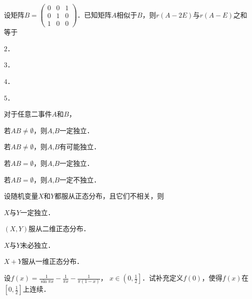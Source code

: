 \documentclass[plain,noanswer,medmath]{../../template/jnuexam}
\begin{document}


\begin{problem}
设矩阵$B = \begin{pmatrix}
  0 & 0 & 1 \\
  0 & 1 & 0 \\
  1 & 0 & 0
\end{pmatrix}$．已知矩阵$A$相似于$B$，则$r(A - 2E)$与$r(A - E)$之和等于\pickout{}
\begin{abcd}
\item $2$．
\item $3$．
\item $4$．
\item $5$．
\end{abcd}
\end{problem}


\begin{problem}
对于任意二事件$A$和$B$，\pickout{}
\begin{abcd}
\item 若$AB \ne \emptyset$，则$A$,$B$一定独立．
\item 若$AB \ne \emptyset$，则$A$,$B$有可能独立．
\item 若$AB = \emptyset$，则$A$,$B$一定独立．
\item 若$AB = \emptyset$，则$A$,$B$一定不独立．
\end{abcd}
\end{problem}


\begin{problem}
设随机变量$X$和$Y$都服从正态分布，且它们不相关，则\pickout{}
\begin{abcd}
\item $X$与$Y$一定独立．
\item $(X,Y)$服从二维正态分布．
\item $X$与$Y$未必独立．
\item $X + Y$服从一维正态分布．
\end{abcd}
\end{problem}



\begin{problem}
设$f(x) = \frac{1}{\sin \pi x} - \frac{1}{\pi x} - \frac{1}{\pi(1 - x)}$，
$x \in\left(0,\frac{1}{2}\right]$．试补充定义$f(0)$，使得$f(x)$在$\left[0,\frac{1}{2}\right]$上连续．
\end{problem}



\end{document}
